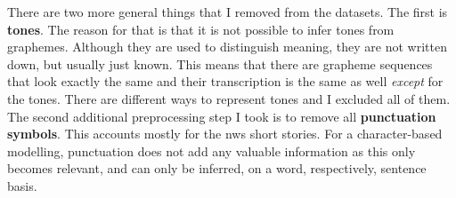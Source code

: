 There are two more general things that I removed from the datasets. The first is \textbf{tones}. The reason for that is that it is not possible to infer tones from graphemes. Although they are used to distinguish meaning, they are not written down, but usually just known. This means that there are grapheme sequences that look exactly the same and their transcription is the same as well \textit{except} for the tones. There are different ways to represent tones and I excluded all of them. The second additional preprocessing step I took is to remove all \textbf{punctuation symbols}. This accounts mostly for the \ac{nws} short stories. For a character-based modelling, punctuation does not add any valuable information as this only becomes relevant, and can only be inferred, on a word, respectively, sentence basis.    

